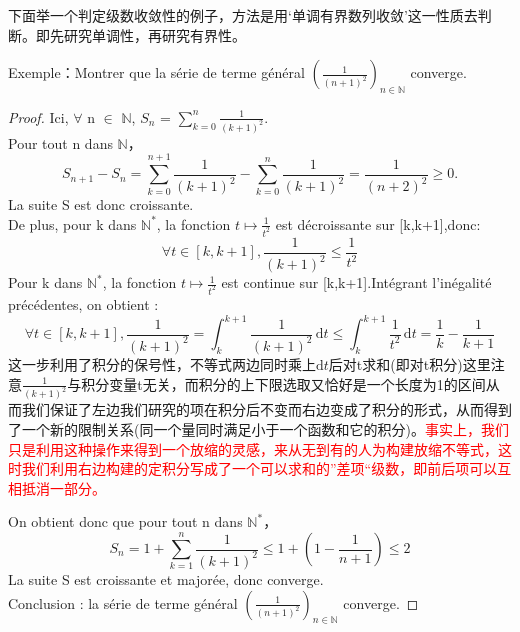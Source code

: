 \documentclass[12pt]{book}
\theoremstyle{definition}\newtheorem{dfn}{Définition}[chapter]
\theoremstyle{plain}\newtheorem{thm}{Théorème}[chapter]
\theoremstyle{plain}\newtheorem{prp}{Proposition}[chapter]
\theoremstyle{plain}\newtheorem{lem}{\bf Lemme}[chapter]
\theoremstyle{plain}\newtheorem{axm}{\bf Axiome}[chapter]
\theoremstyle{plain}\newtheorem{lmm}{\bf Lemme}[chapter]
\theoremstyle{plain}\newtheorem{exm}{\bf Example}[chapter]
\theoremstyle{plain}\newtheorem{cor}{\bf Corollaire}[chapter]
\theoremstyle{remark}\newtheorem{rem}{Remarque}[chapter]
\begin{document}
下面举一个判定级数收敛性的例子，方法是用`单调有界数列收敛’这一性质去判断。即先研究单调性，再研究有界性。


Exemple：Montrer que la série de terme général $(\frac{1}{(n+1)^2})_{n \in \mathbb{N}}$ converge.
\begin{proof}
        Ici, $\forall$ n $\in$ $\mathbb{N}$, $S_n$ = $\sum_{k=0}^{n} {\frac{1}{(k+1)^2}}$.
        \\Pour tout n dans $\mathbb{N}$，
        \begin{equation*}
        S_{n+1}-S_n=\sum_{k=0}^{n+1} {\frac{1}{(k+1)^2}}-\sum_{k=0}^{n} {\frac{1}{(k+1)^2}}=\frac{1}{(n+2)^2}\ge{0}.
        \end{equation*}
        La suite S est donc croissante.\\
        De plus, pour k dans $\mathbb{N^*}$, la fonction $ t\longmapsto \frac{1}{t^2} $ est décroissante sur [k,k+1],donc:
        \begin{equation*}
        \forall t \in [k,k+1], \frac{1}{(k+1)^2} \leqslant \frac{1}{t^2}
        \end{equation*}
        Pour k dans $\mathbb{N^*}$,
        la fonction  $ t\longmapsto \frac{1}{t^2} $ est continue sur [k,k+1].Intégrant l’inégalité précédentes, on obtient :
        \begin{equation*}
        \forall t \in [k,k+1],
        \frac{1}{(k+1)^2} = \int_k^{k+1} \frac{1}{(k+1)^2}\,\mathrm{d}t
        \leqslant \int_k^{k+1} \frac{1}{t^2}\,\mathrm{d}t=
        \frac{1}{k}-\frac{1}{k+1}
        \end{equation*}
        这一步利用了积分的保号性，不等式两边同时乘上$\mathrm{d}t$后对t求和(即对t积分)这里注意$\frac{1}{(k+1)^2}$与积分变量t无关，而积分的上下限选取又恰好是一个长度为1的区间从而我们保证了左边我们研究的项在积分后不变而右边变成了积分的形式，从而得到了一个新的限制关系(同一个量同时满足小于一个函数和它的积分)。\textcolor{red}{事实上，我们只是利用这种操作来得到一个放缩的灵感，来从无到有的人为构建放缩不等式，这时我们利用右边构建的定积分写成了一个可以求和的”差项“级数，即前后项可以互相抵消一部分。}


        On obtient donc que pour tout n dans $\mathbb{N^*}$，
        \begin{equation*}
        S_n=1+\sum_{k=1}^{n} {\frac{1}{(k+1)^2}}
        \leqslant 1+(1-\frac{1}{n+1})
        \leqslant 2
        \end{equation*}
        La suite S est croissante et majorée, donc converge.\\
        Conclusion : la série de terme général $(\frac{1}{(n+1)^2})_{n \in \mathbb{N}}$ converge.
\end{proof}
\end{document}
